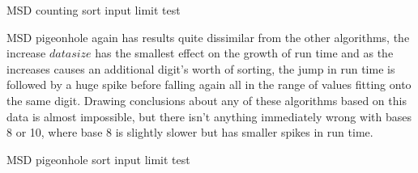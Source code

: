 \documentclass[12pt]{article}
\begin{document}
	\begin{table}[h]
		\centering
			\caption*{MSD counting sort input limit test}
	\end{table}
	\pagebreak
	MSD pigeonhole again has results quite dissimilar from the other algorithms, the increase $data$\textunderscore $size$ has the smallest effect on the growth of run time and as the increases causes an additional digit's worth of sorting, the jump in run time is followed by a huge spike before falling again all in the range of values fitting onto the same digit. Drawing conclusions about any of these algorithms based on this data is almost impossible, but there isn't anything immediately wrong with bases 8 or 10, where base 8 is slightly slower but has smaller spikes in run time.
	\begin{table}[h]
		\centering
			\caption*{MSD pigeonhole sort input limit test}
	\end{table}
\end{document}
